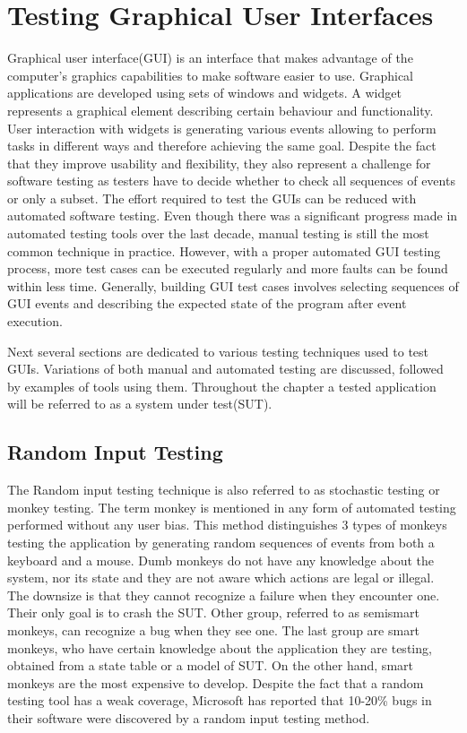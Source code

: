 \chapter{Testing Graphical User Interfaces}
Graphical user interface(GUI) is an interface that makes advantage of the computer's graphics capabilities to make software easier to use.\cite{guidefinition} Graphical applications are developed using sets of windows and widgets. A widget represents a graphical element describing certain behaviour and functionality. User interaction with widgets is generating various events allowing to perform tasks in different ways and therefore achieving the same goal. Despite the fact that they improve usability and flexibility, they also represent a challenge for software testing as testers have to decide whether to check all sequences of events or only a subset. The effort required to test the GUIs can be reduced with automated software testing. Even though there was a significant progress made in automated testing tools over the last decade, manual testing is still the most common technique in practice. However, with a proper automated GUI testing process, more test cases can be executed regularly and more faults can be found within less time.\cite{patternbasedtesting} Generally, building GUI test cases involves selecting sequences of GUI events and describing the expected state of the program after event execution.\cite{NguyenBao2014Gait}

Next several sections are dedicated to various testing techniques used to test GUIs. Variations of both manual and automated testing are discussed, followed by examples of tools using them.  Throughout the chapter a tested application will be referred to as a system under test(SUT).


\section{Random Input Testing}
The Random input testing technique is also referred to as stochastic testing or monkey testing. The term monkey is mentioned in any form of automated testing performed without any user bias. This method distinguishes 3 types of monkeys testing the application by generating random sequences of events from both a keyboard and a mouse. Dumb monkeys do not have any knowledge about the system, nor its state and they are not aware which actions are legal or illegal. The downsize is that they cannot recognize a failure when they encounter one. Their only goal is to crash the SUT. Other group, referred to as semismart monkeys, can recognize a bug when they see one. The last group are smart monkeys, who have certain knowledge about the application they are testing, obtained from a state table or a model of SUT. On the other hand, smart monkeys are the most expensive to develop. Despite the fact that a random testing tool has a weak coverage, Microsoft has reported that 10-20\% bugs in their software were discovered by a  random input testing method.\cite{nyman}


